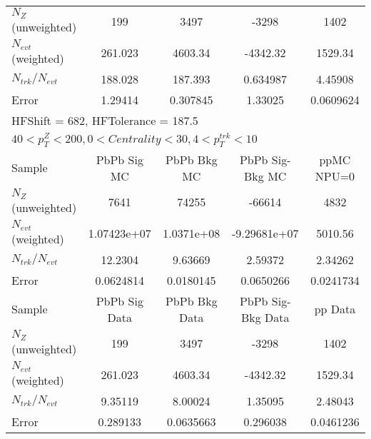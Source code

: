 \begin{table}[h!]
\begin{tabular}{|l|c|c|c|c|}
$N_Z$ (unweighted)& 199            & 3497           & -3298          & 1402           \\
$N_{evt}$ (weighted)& 261.023        & 4603.34        & -4342.32       & 1529.34        \\
$N_{trk}/N_{evt}$& 188.028        & 187.393        & 0.634987       & 4.45908        \\
Error          & 1.29414        & 0.307845       & 1.33025        & 0.0609624      \\
\hline\hline
\multicolumn{5}{l}{ HFShift = 682, HFTolerance = 187.5}\\
\multicolumn{5}{l}{ $40 < p_{T}^{Z} < 200, 0 < Centrality < 30, 4 < p_{T}^{trk} < 10$}\\
\hline\hline
Sample         & PbPb Sig MC    & PbPb Bkg MC    & PbPb Sig-Bkg MC& ppMC NPU=0     \\
$N_Z$ (unweighted)& 7641           & 74255          & -66614         & 4832           \\
$N_{evt}$ (weighted)& 1.07423e+07    & 1.0371e+08     & -9.29681e+07   & 5010.56        \\
$N_{trk}/N_{evt}$& 12.2304        & 9.63669        & 2.59372        & 2.34262        \\
Error          & 0.0624814      & 0.0180145      & 0.0650266      & 0.0241734      \\
\hline
Sample         & PbPb Sig Data  & PbPb Bkg Data  & PbPb Sig-Bkg Data& pp Data  \\
$N_Z$ (unweighted)& 199            & 3497           & -3298          & 1402           \\
$N_{evt}$ (weighted)& 261.023        & 4603.34        & -4342.32       & 1529.34        \\
$N_{trk}/N_{evt}$& 9.35119        & 8.00024        & 1.35095        & 2.48043        \\
Error          & 0.289133       & 0.0635663      & 0.296038       & 0.0461236      \\
\hline\hline
\end{tabular}
\end{table}
\clearpage
